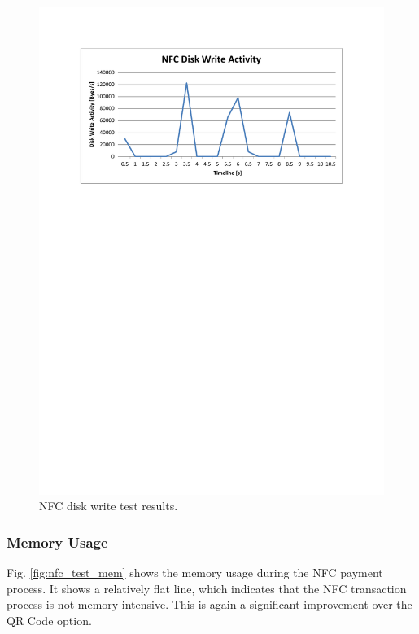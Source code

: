 \begin{figure}
 \centering 
 \includegraphics[clip=true, trim = 0 530 0 70,
 scale=0.7]{nfc_test_disk}
 \caption{NFC disk write test results.}
 \label{fig:nfc_test_disk}
\end{figure}

\subsubsection{Memory Usage}
\label{sec:nfc_mem}

Fig. \ref{fig:nfc_test_mem} shows the memory usage during the NFC payment process. It
shows a relatively flat line, which indicates that the NFC transaction process is not
memory intensive. This is again a significant improvement over the QR Code option. 

